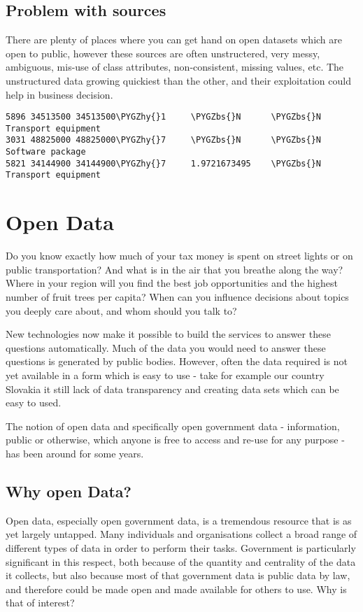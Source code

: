 \documentclass[letterpaper,10pt,oneside]{sphinxmanual}
\def\PYGZbs{\char`\\}
\def\PYGZhy{\char`\-}
\begin{document}
\subsection{Problem with sources}
\label{introduction:problem-with-sources}
There are plenty of places where you can get hand on open datasets which are open to public, however these
sources are often unstructered, very messy, ambiguous, mis-use of class attributes, non-consistent, missing values,
etc. The unstructured data growing quickiest than the other, and their exploitation could help in business decision.

\def\SphinxLiteralBlockLabel{\label{introduction:example-of-unstructed-data}}
\begin{Verbatim}[commandchars=\\\{\}]
5896 34513500 34513500\PYGZhy{}1     \PYGZbs{}N      \PYGZbs{}N Transport equipment
3031 48825000 48825000\PYGZhy{}7     \PYGZbs{}N      \PYGZbs{}N      Software package
5821 34144900 34144900\PYGZhy{}7     1.9721673495    \PYGZbs{}N      Transport equipment
\end{Verbatim}
\let\SphinxLiteralBlockLabel\empty


\section{Open Data}
\label{introduction:open-data}
Do you know exactly how much of your tax money is spent on street lights or on public transportation? And what is in the air that you breathe along the way? Where in your region will you find the best job opportunities and the highest number of fruit trees per
capita? When can you influence decisions about topics you deeply care about, and whom should you talk to?

New technologies now make it possible to build the services to answer these questions automatically. Much of the data you would need to answer these questions is generated by public bodies. However, often the data required is not yet available in a form which is easy to use - take for example our country Slovakia it still lack of data transparency and creating data sets which can be easy to used.

The notion of open data and specifically open government data - information, public or otherwise, which anyone is free to access and re-use for any purpose - has been around for some years.


\subsection{Why open Data?}
\label{introduction:why-open-data}
Open data, especially open government data, is a tremendous resource that is as yet largely untapped. Many individuals and organisations collect a broad range of different types of data in order to perform their tasks. Government is particularly significant in this respect, both because of the quantity and centrality of the data it collects, but also because most of that government data is public data by law, and therefore could be made open and made available for others to use. Why is that of interest?
\end{document}
